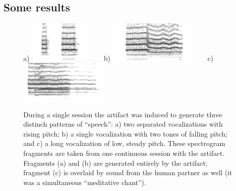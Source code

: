 \subsection{Some results}


\begin{figure}[p]

\centerline{
a)
\includegraphics[height=2cm]{images/chico-output-separate-high-low}
\ \ 
\ \ 
b)
\includegraphics[height=2cm]{images/chico-output-pair-high-low}
\ \ 
\ \ 
c)
\includegraphics[height=2cm]{images/chico-output-ohm}
}

\caption{
%
\label{fig:outcome}
%
During a single session the artifact was induced
to generate three distinch patterns of ``speech'': a) two separated
vocalizations with rising pitch; b) a single vocalization with
two tones of falling pitch; and c) a long vocalization of low, steady
pitch.
%
These spectrogram fragments are taken from one continuous session
with the artifact.  Fragments (a) and (b) are generated entirely
by the artifact; fragment (c) is overlaid by sound from
the human partner as well (it was a simultaneous ``meditative chant'').
%
}

\end{figure}





